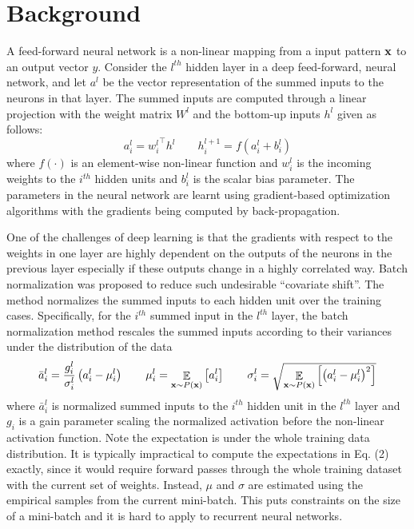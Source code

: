 \documentclass{article}
\newcommand{\T}{\top}
\newcommand{\actFunc}{{f}}
\newcommand{\gain}{{g}}
\newcommand{\bias}{{b}}
\newcommand{\Weights}{{W}}
\newcommand{\weights}{{w}}
\newcommand{\hidden}{{h}}
\newcommand{\act}{{a}}
\newcommand{\data}{{\bold x}}
\newcommand{\expectation}{\mathop{\mathbb{E}}}
\begin{document}
\section{Background}
\label{sec:model}

A feed-forward neural network is a non-linear mapping from a input pattern $\data$ to an output vector $y$. Consider the $l^{th}$ hidden layer in a deep feed-forward, neural network, and let $\act^l$ be the vector representation of the summed inputs to the neurons in that layer. The summed inputs are computed through a linear projection with the weight matrix $\Weights^l$ and the bottom-up inputs $\hidden^l$ given as follows:
\begin{equation}
\act^l_i = {\weights^l_i}^\T \hidden^l
\qquad
\hidden^{l+1}_i = \actFunc(\act^l_i + \bias^l_i)
\end{equation}
where $\actFunc(\cdot)$ is an element-wise non-linear function and $\weights^l_i$ is the incoming weights to the $i^{th}$ hidden units and $\bias^l_i$ is the scalar bias parameter. The parameters in the neural network are learnt using gradient-based optimization algorithms with the gradients being computed by back-propagation. 

One of the challenges of deep learning is that the gradients with respect to the weights in one layer are highly dependent on the outputs of the neurons in the previous layer especially if these outputs change in a highly correlated way. 
Batch normalization \citep{ioffe2015batch} was proposed to reduce such undesirable ``covariate shift''. The method normalizes the summed inputs to each hidden unit over the training cases.  Specifically, for the $i^{th}$ summed input in the $l^{th}$ layer, the batch normalization method rescales the summed inputs according to their variances under the distribution of the  data
\begin{equation}
\bar{\act}^l_i = {\gain^l_i\over\sigma^l_i}\left(\act^l_i - \mu^l_i \right)
\qquad
\mu^l_i = \expectation_{\data \sim P(\data)} \left[ \act^l_i \right]
\qquad
\sigma^l_i = \sqrt{\expectation_{\data \sim P(\data)} \left[\left( \act^l_i  - \mu^l_i \right)^2\right]}
\label{eq:bn}
\end{equation}
where $\bar{\act}^l_i$ is normalized summed inputs to the $i^{th}$ hidden unit in the $l^{th}$ layer and $g_i$ is a gain parameter scaling the normalized activation before the non-linear activation function. Note the expectation is under the whole training data distribution.  It is typically impractical to compute the expectations in Eq. (2) exactly, since it would require forward passes through the whole training dataset with the current set of weights.  Instead, $\mu$ and $\sigma$ are estimated using the empirical samples from the current mini-batch. This puts constraints on the size of a mini-batch and it is hard to apply to recurrent neural networks.
\end{document}
